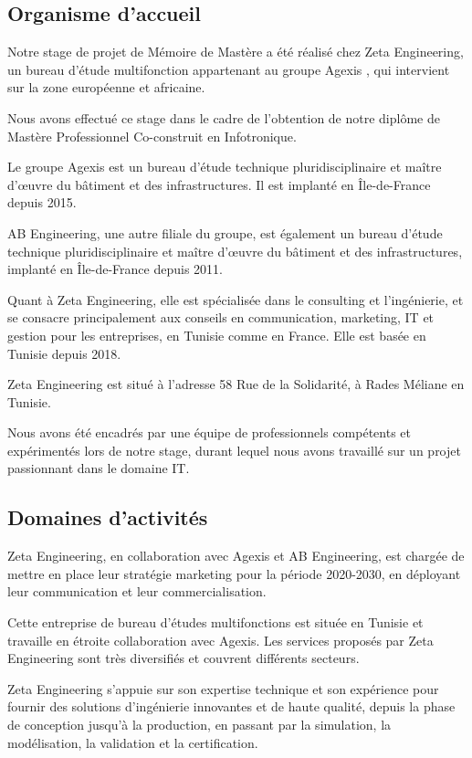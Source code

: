 \subsection{Organisme d'accueil}


Notre stage de projet de Mémoire de Mastère a été réalisé chez Zeta Engineering, un bureau d'étude multifonction appartenant au groupe Agexis \cite{agexis}, qui intervient sur la zone européenne et africaine.

Nous avons effectué ce stage dans le cadre de l'obtention de notre diplôme de Mastère Professionnel Co-construit en Infotronique.

Le groupe Agexis est un bureau d'étude technique pluridisciplinaire et maître d'œuvre du bâtiment et des infrastructures. Il est implanté en Île-de-France depuis 2015. 


AB Engineering, une autre filiale du groupe, est également un bureau d'étude technique pluridisciplinaire et maître d'œuvre du bâtiment et des infrastructures, implanté en Île-de-France depuis 2011.


Quant à Zeta Engineering, elle est spécialisée dans le consulting et l'ingénierie, et se consacre principalement aux conseils en communication, marketing, IT et gestion pour les entreprises, en Tunisie comme en France. Elle est basée en Tunisie depuis 2018.


Zeta Engineering est situé à l'adresse 58 Rue de la Solidarité, à Rades Méliane en Tunisie.


Nous avons été encadrés par une équipe de professionnels compétents et expérimentés lors de notre stage, durant lequel nous avons travaillé sur un projet passionnant dans le domaine IT.





\subsection{Domaines d'activités}
Zeta Engineering, en collaboration avec Agexis et AB Engineering, est chargée de mettre en place leur stratégie marketing pour la période 2020-2030, en déployant leur communication et leur commercialisation.


Cette entreprise de bureau d'études multifonctions est située en Tunisie et travaille en étroite collaboration avec Agexis. Les services proposés par Zeta Engineering sont très diversifiés et couvrent différents secteurs.

Zeta Engineering s'appuie sur son expertise technique et son expérience pour fournir des solutions d'ingénierie innovantes et de haute qualité, depuis la phase de conception jusqu'à la production, en passant par la simulation, la modélisation, la validation et la certification. 






